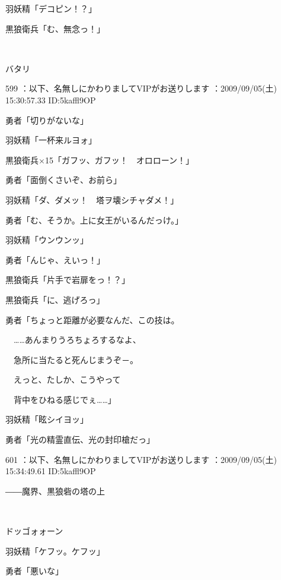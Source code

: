 \documentclass[a4j,twocolumn]{tarticle}
\begin{document}
羽妖精「デコピン！？」\par{} 
黒狼衛兵「む、無念っ！」  

　

バタリ 

	
    
    

599 ：以下、名無しにかわりましてVIPがお送りします ：2009/09/05(土) 15:30:57.33 ID:5kaffl9OP 


勇者「切りがないな」\par{} 
羽妖精「一杯来ルヨォ」 



黒狼衛兵×15「ガフッ、ガフッ！　オロローン！」 



勇者「面倒くさいぞ、お前ら」\par{} 
羽妖精「ダ、ダメッ！　塔ヲ壊シチャダメ！」 



勇者「む、そうか。上に女王がいるんだっけ。」\par{} 
羽妖精「ウンウンッ」 



勇者「んじゃ、えいっ！」\par{} 
黒狼衛兵「片手で岩扉をっ！？」\par{} 
黒狼衛兵「に、逃げろっ」 



勇者「ちょっと距離が必要なんだ、この技は。\par{} 
　……あんまりうろちょろするなよ、\par{} 
　急所に当たると死んじまうぞ－。\par{} 
　えっと、たしか、こうやって\par{} 
　背中をひねる感じでぇ……」 



羽妖精「眩シイヨッ」 



勇者「光の精霊直伝、光の封印槍だっ」 

	
    
    

601 ：以下、名無しにかわりましてVIPがお送りします ：2009/09/05(土) 15:34:49.61 ID:5kaffl9OP 


――魔界、黒狼砦の塔の上 

　

ドッゴォォーン 



羽妖精「ケフッ。ケフッ」\par{} 
勇者「悪いな」 
\end{document}
